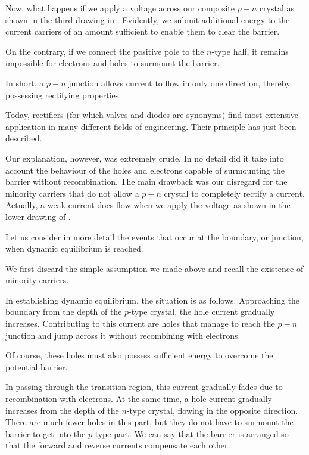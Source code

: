 Now, what happens if we apply a voltage across our composite $p\!-\!n$ crystal as shown in the third drawing in . Evidently, we submit additional energy to the current carriers of an amount sufficient to enable them to clear the barrier.

On the contrary, if we connect the positive pole to the $n$-type half, it remains impossible for electrons and holes to surmount the barrier.

In short, a $p\!-\!n$ junction allows current to flow in only one direction, thereby possessing rectifying properties. 

Today, rectifiers (for which valves and diodes are synonyms) find most extensive application in many different fields of engineering. Their principle has just been described.

Our explanation, however, was extremely crude. In no detail did it take into account the behaviour of the holes and electrons capable of surmounting the barrier without recombination. The main drawback was our disregard for the minority carriers that do not allow a $p\!-\!n$ crystal to completely rectify a current. Actually, a weak current does flow when we apply the voltage as shown in the lower drawing of .

Let us consider in more detail the events that occur at the boundary, or junction, when dynamic equilibrium is reached.

We first discard the simple assumption we made above and recall the existence of minority carriers.

In establishing dynamic equilibrium, the situation is as follows. Approaching the boundary from the depth of the $p$-type crystal, the hole current gradually increases. Contributing to this current are holes that manage to reach the $p\!-\!n$ junction and jump across it without recombining with electrons.

Of course, these holes must also possess sufficient energy to overcome the potential barrier.

In passing through the transition region, this current gradually fades due to recombination with electrons. At the same time, a hole current gradually increases from the depth of the $n$-type crystal, flowing in the opposite direction. There are much fewer holes in this part, but they do not have to surmount the barrier to get into the $p$-type part. We can say that the barrier is arranged so that the forward and reverse currents compensate each other.

